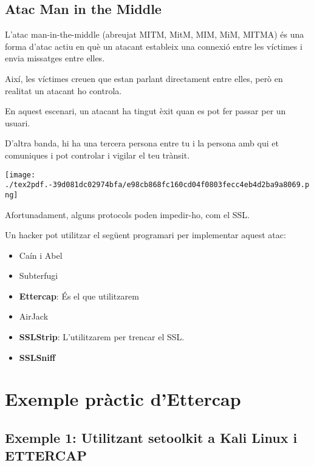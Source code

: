 \documentclass[]{article}
\begin{document}
\hypertarget{atac-man-in-the-middle}{%
\subsection{\texorpdfstring{\textbf{Atac Man in the
Middle}}{Atac Man in the Middle}}\label{atac-man-in-the-middle}}

L'atac man-in-the-middle (abreujat MITM, MitM, MIM, MiM, MITMA) és una
forma d'atac actiu en què un atacant estableix una connexió entre les
víctimes i envia missatges entre elles.

Així, les víctimes creuen que estan parlant directament entre elles,
però en realitat un atacant ho controla.

En aquest escenari, un atacant ha tingut èxit quan es pot fer passar per
un usuari.

D'altra banda, hi ha una tercera persona entre tu i la persona amb qui
et comuniques i pot controlar i vigilar el teu trànsit.

\texttt{[image: ./tex2pdf.-39d081dc02974bfa/e98cb868fc160cd04f0803fecc4eb4d2ba9a8069.png]}

Afortunadament, alguns protocols poden impedir-ho, com el SSL.

Un hacker pot utilitzar el següent programari per implementar aquest
atac:

\begin{itemize}
\item
  Caín i Abel
\item
  Subterfugi
\item
  \textbf{Ettercap}: És el que utilitzarem
\item
  AirJack
\item
  \textbf{SSLStrip}: L'utilitzarem per trencar el SSL.
\item
  \textbf{SSLSniff}
\end{itemize}

\hypertarget{exemple-pruxe0ctic-dettercap}{%
\section{\texorpdfstring{\textbf{Exemple pràctic
d'Ettercap}}{Exemple pràctic d'Ettercap}}\label{exemple-pruxe0ctic-dettercap}}

\hypertarget{exemple-1-utilitzant-setoolkit-a-kali-linux-i-ettercap}{%
\subsection{\texorpdfstring{\textbf{Exemple 1: Utilitzant
\textbf{setoolkit} a Kali Linux i
ETTERCAP}}{Exemple 1: Utilitzant setoolkit a Kali Linux i ETTERCAP}}\label{exemple-1-utilitzant-setoolkit-a-kali-linux-i-ettercap}}
\end{document}
